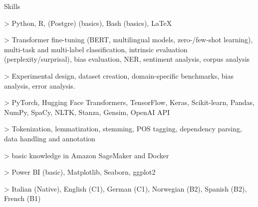 
\begin{rubric}{Skills}
    
    > Python, R, (Postgre) (basics), Bash (basics), \LaTeX

> Transformer fine-tuning (BERT, multilingual models, zero-/few-shot learning), multi-task and multi-label classification, intrinsic evaluation (perplexity/surprisal), bias evaluation, NER, sentiment analysis, corpus analysis

 > Experimental design, dataset creation, domain-specific benchmarks, bias analysis, error analysis.

> PyTorch, Hugging Face Transformers, TensorFlow, Keras, Scikit-learn, Pandas, NumPy, SpaCy, NLTK, Stanza, Gensim, OpenAI API

> Tokenization, lemmatization, stemming, POS tagging, dependency parsing, data handling and annotation

> basic knowledge in Amazon SageMaker and Docker

> Power BI (basic), Matplotlib, Seaborn, ggplot2

\entry*[Languages]
	> Italian (Native), English (C1), German (C1), Norwegian (B2), Spanish (B2), French (B1)

\end{rubric}
